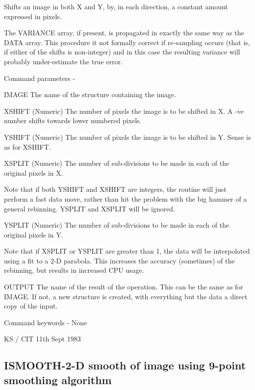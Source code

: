 \begin{description}
\begin{description}
\begin{terminalv}
 Shifts an image in both X and Y, by, in each direction,
 a constant amount expressed in pixels.

 The VARIANCE array, if present, is propagated in exactly the same
 way as the DATA array.  This procedure it not formally correct if
 re-sampling occurs (that is, if either of the shifts is non-integer)
 and in this case the resulting variance will probably under-estimate
 the true error.

 Command parameters -

 IMAGE  The name of the structure containing the image.

 XSHIFT (Numeric) The number of pixels the image is to be
        shifted in X.  A -ve number shifts towards lower
        numbered pixels.

 YSHIFT (Numeric) The number of pixels the image is to be
        shifted in Y.  Sense is as for XSHIFT.

 XSPLIT (Numeric) The number of sub-divisions to be made in
        each of the original pixels in X.

        Note that if both YSHIFT and XSHIFT are integers, the
        routine will just perform a fast data move, rather
        than hit the problem with the big hammer of a general
        rebinning.  YSPLIT and XSPLIT will be ignored.

 YSPLIT (Numeric) The number of sub-divisions to be made in
        each of the original pixels in Y.

        Note that if XSPLIT or YSPLIT are greater than 1,
        the data will be interpolated using a fit to a 2-D
        parabola.  This increases the accuracy (sometimes)
        of the rebinning, but results in increased CPU usage.

 OUTPUT The name of the result of the operation.  This can
        be the same as for IMAGE.  If not, a new structure
        is created, with everything but the data a direct
        copy of the input.

 Command keywords -  None

                                  KS / CIT 11th Sept 1983
\end{terminalv}
\end{description}
\subsection{ISMOOTH-\label{ISMOOTH}2-D smooth of image using 9-point smoothing algorithm}
\begin{description}


\end{description}
\end{description}
